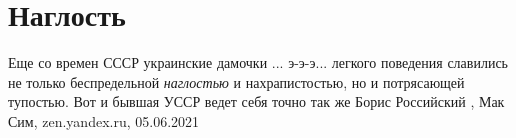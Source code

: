  
 
 
 
 
\chapter{Наглость}

Еще со времен СССР украинские дамочки ... э-э-э... легкого поведения славились
не только беспредельной \emph{наглостью} и нахрапистостью, но и потрясающей
тупостью.  Вот и бывшая УССР ведет себя точно так же
Борис Российский
, 
Мак Сим, zen.yandex.ru, 05.06.2021


